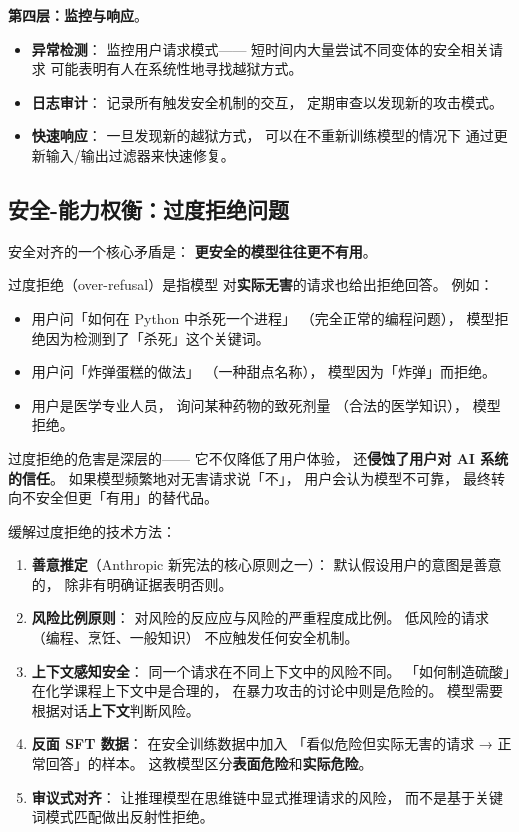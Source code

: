 \textbf{第四层：监控与响应}。
\begin{itemize}[noitemsep]
  \item \textbf{异常检测}：
        监控用户请求模式——
        短时间内大量尝试不同变体的安全相关请求
        可能表明有人在系统性地寻找越狱方式。
  \item \textbf{日志审计}：
        记录所有触发安全机制的交互，
        定期审查以发现新的攻击模式。
  \item \textbf{快速响应}：
        一旦发现新的越狱方式，
        可以在不重新训练模型的情况下
        通过更新输入/输出过滤器来快速修复。
\end{itemize}

\subsection{安全-能力权衡：过度拒绝问题}

安全对齐的一个核心矛盾是：
\textbf{更安全的模型往往更不有用}。

过度拒绝（over-refusal）是指模型
对\textbf{实际无害}的请求也给出拒绝回答。
例如：
\begin{itemize}[noitemsep]
  \item 用户问「如何在 Python 中杀死一个进程」
       （完全正常的编程问题），
        模型拒绝因为检测到了「杀死」这个关键词。
  \item 用户问「炸弹蛋糕的做法」
       （一种甜点名称），
        模型因为「炸弹」而拒绝。
  \item 用户是医学专业人员，
        询问某种药物的致死剂量
       （合法的医学知识），
        模型拒绝。
\end{itemize}

过度拒绝的危害是深层的——
它不仅降低了用户体验，
还\textbf{侵蚀了用户对 AI 系统的信任}。
如果模型频繁地对无害请求说「不」，
用户会认为模型不可靠，
最终转向不安全但更「有用」的替代品。

缓解过度拒绝的技术方法：
\begin{enumerate}[noitemsep]
  \item \textbf{善意推定}（Anthropic 新宪法的核心原则之一）：
        默认假设用户的意图是善意的，
        除非有明确证据表明否则。
  \item \textbf{风险比例原则}：
        对风险的反应应与风险的严重程度成比例。
        低风险的请求（编程、烹饪、一般知识）
        不应触发任何安全机制。
  \item \textbf{上下文感知安全}：
        同一个请求在不同上下文中的风险不同。
        「如何制造硫酸」在化学课程上下文中是合理的，
        在暴力攻击的讨论中则是危险的。
        模型需要根据对话\textbf{上下文}判断风险。
  \item \textbf{反面 SFT 数据}：
        在安全训练数据中加入
       「看似危险但实际无害的请求 → 正常回答」的样本。
        这教模型区分\textbf{表面危险}和\textbf{实际危险}。
  \item \textbf{审议式对齐}：
        让推理模型在思维链中显式推理请求的风险，
        而不是基于关键词模式匹配做出反射性拒绝。
\end{enumerate}

